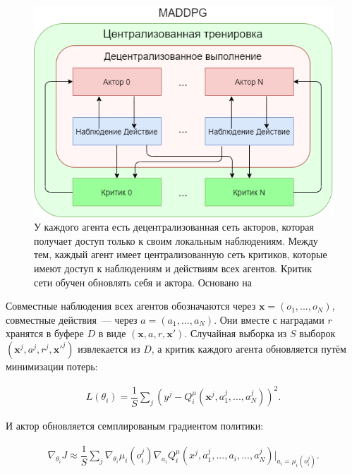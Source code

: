 \begin{figure}[ht!]
    \center
    \includegraphics [scale=0.80] {my_folder/images/ch2/maddpg.png}
    \caption{У каждого агента есть децентрализованная сеть акторов, которая получает доступ только к своим локальным наблюдениям. Между тем, каждый агент имеет централизованную сеть критиков, которые имеют доступ к наблюдениям и действиям всех агентов. Критик сети обучен обновлять себя и актора. Основано на \cite{lowe2017multiagent}}
    \label{fig:ch2-maddpg}
\end{figure}

Совместные наблюдения всех агентов обозначаются через ${\mathbf{x} = (o_1, ..., o_N)}$, совместные действия~--- через ${a = (a_1, ..., a_N)}$. Они вместе с наградами $r$ хранятся в буфере $D$ в виде ${(\mathbf{x}, a, r, \mathbf{x}')}$. Случайная выборка из $S$ выборок ${(\mathbf{x}^j, a^j, r^j, \mathbf{x}'^j)}$ извлекается из $D$, а критик каждого агента обновляется путём минимизации потерь:

\begin{equation}
    \begin{multlined}
        L(\theta_i) = \dfrac{1}{S} \sum_j (y^j - Q_{i}^\mu (\mathbf x^j, a_{1}^j, ...,a_{N}^j))^2.
    \end{multlined}
\end{equation}

И актор обновляется семплированым градиентом политики:

\begin{equation}
    \begin{multlined}
        \nabla_{\theta_i} J \approx \dfrac{1}{S} \sum_j \nabla_{\theta_i} \mu_i (o^j_i) \nabla_{a_i} Q^\mu_i (x^j, a^j_1, ..., a_i, ..., a^j_N)|_{a_i=\mu_i(o^j_i)}.
    \end{multlined}
\end{equation}

